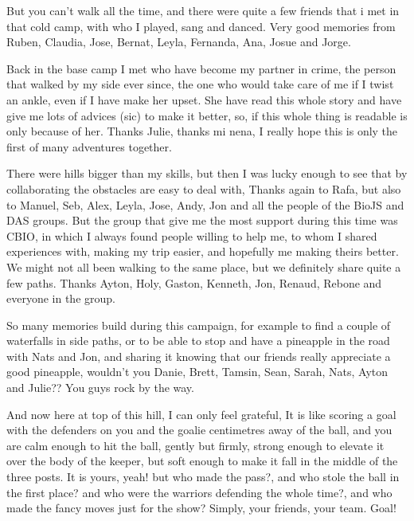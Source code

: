 But you can't walk all the time, and there were quite a few friends that i met in that cold camp, with who I played, sang and danced. Very good memories from Ruben, Claudia, Jose, Bernat, Leyla, Fernanda, Ana, Josue and Jorge.

Back in the base camp I met who have become my partner in crime, the person that walked by my side ever since, the one who would take care of me if I twist an ankle, even if I have make her upset. She have read this whole story and have give me lots of advices (sic) to make it better, so, if this whole thing is readable is only because of her. Thanks Julie, thanks mi nena, I really hope this is only the first of many adventures together.

There were hills bigger than my skills, but then I was lucky enough to see that by collaborating the obstacles are easy to deal with, Thanks again to Rafa, but also to Manuel, Seb, Alex, Leyla, Jose, Andy, Jon and all the people of the BioJS and DAS groups. But the group that give me the most support during this time was CBIO, in which I always found people willing to help me, to whom I shared experiences with, making my trip easier, and hopefully me making theirs better. We might not all been walking to the same place, but we definitely share quite a few paths. Thanks Ayton, Holy, Gaston, Kenneth, Jon, Renaud, Rebone and everyone in the group.

So many memories build during this campaign, for example to find a couple of waterfalls in side paths, or to be able to stop and have a pineapple in the road with Nats and Jon, and sharing it knowing that our friends really appreciate a good pineapple, wouldn't you Danie, Brett, Tamsin, Sean, Sarah, Nats, Ayton and Julie?? You guys rock by the way.

And now here at top of this hill, I can only feel grateful, It is like scoring a goal with the defenders on you and the goalie centimetres away of the ball, and you are calm enough to hit the ball, gently but firmly, strong enough to elevate it over the body of the keeper, but soft enough to make it fall in the middle of the three posts. It is yours, yeah! but who made the pass?, and who stole the ball in the first place? and who were the warriors defending the whole time?, and who made the fancy moves just for the show? Simply, your friends, your team. Goal!

